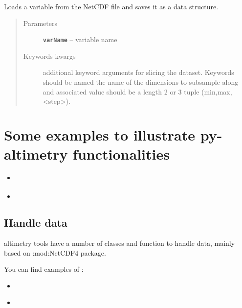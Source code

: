\documentclass[letterpaper,10pt,english]{sphinxmanual}
\begin{document}
\begin{fulllineitems}
\label{altimetry.tools.nctools:altimetry.tools.nctools.load_ncVar}
Loads a variable from the NetCDF file and saves it as a data structure.
\begin{quote}\begin{description}
\item[{Parameters}] \leavevmode
\textbf{\texttt{varName}} -- variable name

\item[{Keywords kwargs}] \leavevmode
additional keyword arguments for slicing the dataset. Keywords should be named the name of the dimensions to subsample along and associated value should be a length 2 or 3 tuple (min,max,\textless{}step\textgreater{}).

\end{description}\end{quote}

\end{fulllineitems}



\section{Some examples to illustrate py-altimetry functionalities}
\label{Examples:some-examples-to-illustrate-py-altimetry-functionalities}\label{Examples::doc}\begin{itemize}\setlength{\itemsep}{0pt}\setlength{\parskip}{0pt}
\item {} 
{\hyperref[Examples:data]{\emph{}}}

\item {} 
{\hyperref[Examples:others]{\emph{}}}

\end{itemize}


\subsection{Handle data}
\label{Examples:handle-data}\label{Examples:data}
altimetry tools have a number of classes and function to handle data, mainly based on :mod:NetCDF4 package.

You can find examples of :
\begin{itemize}
\item {} 
{\hyperref[altimetry.tools.nctools:nc]{\emph{}}}

\item {} 
{\hyperref[altimetry.data:alti-data]{\emph{}}}

\end{itemize}
\end{document}
